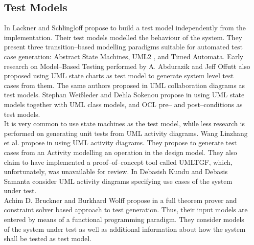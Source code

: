 \subsection{Test Models}
In \cite{lackner2012modeling} Lackner and Schlingloff propose to build a test model independently from the implementation. Their test models modelled the behaviour of the system. They present three transition--based modelling paradigms suitable for automated test case generation: Abstract State Machines, UML2 , and Timed Automata. Early research on Model--Based Testing performed by A. Abdurazik and Jeff Offutt \cite{Offutt:1999:GeneratingTestsFromUmlSpec} also proposed using UML state charts as test model to generate system level test cases from them. The same authors proposed in \cite{Abdurazik00usingumlCollaborationTestGeneration} UML collaboration diagrams as test models. Stephan Wei{\ss}leder and Dehla Sokenou propose in \cite{weissleder2008automatic} using UML state models together with UML class models, and OCL pre-- and post--conditions as test models.\\
It is very common to use state machines as the test model, while less research is performed on generating unit tests from UML activity diagrams. Wang Linzhang et al. propose in \cite{Linzhang04GeneratingTestCasefromActivityGrayBoxMethod} using UML activity diagrams. They propose to generate test cases from an Activity modelling an operation in the design model. They also claim to have implemented a proof--of--concept tool called UMLTGF, which, unfortunately, was unavailable for review. %
In \cite{kundu2009novel} Debasish Kundu and Debasis Samanta consider UML activity diagrams specifying use cases of the system under test.%
\\
Achim D. Bruckner and Burkhard Wolff propose in \cite{brucker2012theoremProverBasedTesting} a full theorem prover and constraint solver based approach to test generation. Thus, their input models are entered by means of a functional programming paradigm. They consider models of the system under test as well as additional information about how the system shall be tested as test model.\\
